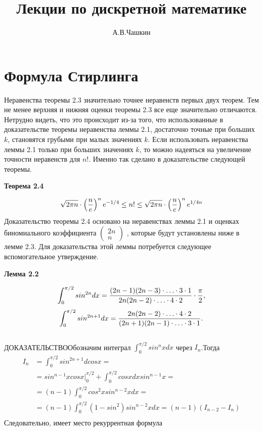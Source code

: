 \documentclass[12pt]{article}
\author{А.В.Чашкин}
\title{\bf Лекции по дискретной математике }
\begin{document}
\maketitle
\newpage
\tableofcontents  
\newpage

\section { Формула Стирлинга }
Неравенства теоремы 2.3 значительно точнее неравенств первых двух теорем. Тем не менее верхняя и нижняя оценки теоремы 2.3 все еще значительно отличаются. Нетрудно видеть, что это происходит из-за того, что использованные в доказательстве теоремы неравенства леммы 2.1, достаточно точные при больших $k$, становятся грубыми при малых значениях $k$.
Если использовать неравенства леммы 2.1 только при больших значениях $k$, то можно надеяться на увеличение точности неравенств для $n!$. Именно так сделано в доказательстве следующей теоремы.\\
\begin{flushleft}
\large \bf{Теорема 2.4}
\end{flushleft}
\begin{equation}
\sqrt{2\pi n}\cdot \left(\frac{n}{e}\right)^n e^{-1/4}\le n!\le \sqrt{2\pi n}\cdot \left(\frac{n}{e}\right)^n e^{1/4n} \notag
\end{equation}
  Доказательство теоремы 2.4 основано на неравенствах леммы 2.1 и оценках биномиального коэффициента $\begin{pmatrix} 2n\\n \end{pmatrix}$ , которые будут установлены ниже в лемме 2.3. Для доказательства этой леммы потребуется следующее вспомогательное утверждение.
\begin{flushleft}
\large \bf{Лемма 2.2}
\end{flushleft}
\begin{equation}
  \int_0^{\pi/2}{sin^{2n}d x}= \frac{(2n-1)(2n-3) \cdot \ldots \cdot 3 \cdot 1}{2n(2n-2) \cdot \ldots  \cdot 4 \cdot 2} \cdot \frac{\pi}{2},  \notag
\end{equation}
\begin{equation}
    \int_0^{\pi/2}{sin^{2n+1}d x}= \frac{2n(2n-2) \cdot \ldots \cdot 4 \cdot 2}{(2n+1)(2n-1) \cdot \ldots \cdot 3 \cdot 1}.\notag
\end{equation}\\
\textsc{ДОКАЗАТЕЛЬСТВО}\text{ }Обозначим интеграл $\int_0^{\pi/2}{sin^n x d x}$ через $I_n$.Тогда 
\begin{align*}
        I_n&=\int_0^{\pi/2}{sin^{2n+1}d cos x}=\\
        &= sin^{n-1}x cos{x}\bigl|_0^{\pi/2}+\int_0^{\pi/2}{cos{x}d x}sin^{n-1}x=\\ &= (n-1)\int_0^{\pi/2}{cos^2{x}sin^{n-2}{x}d x}=\\ &= (n-1)\int_0^{\pi/2}{(1-sin^2)sin^{n-2}{x}d x}=(n-1)(I_{n-2}-I_n)\\ 
\end{align*} Следовательно, имеет место рекуррентная формула
\end{document}
